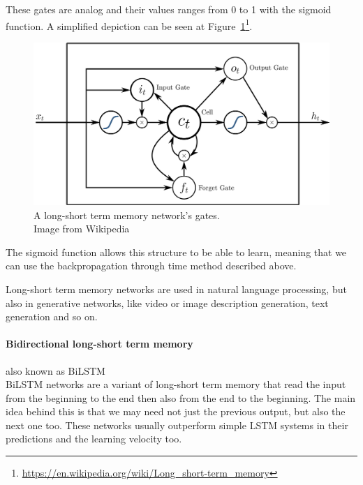 These gates are analog and their values ranges from 0 to 1 with the sigmoid function. A simplified depiction can be seen at Figure~\ref{fig:lstm}\footnote{\url{https://en.wikipedia.org/wiki/Long_short-term_memory}}.
\begin{figure}[!htb]
	\centering
	\includegraphics[scale=0.2]{figures/lstm.jpg}
	\caption{A long-short term memory network's gates.\\Image from Wikipedia}
	\label{fig:lstm}
\end{figure}
\FloatBarrier

The sigmoid function allows this structure to be able to learn, meaning that we can use the backpropagation through time method described above.

Long-short term memory networks are used in natural language processing, but also in generative networks, like video or image description generation, text generation and so on.

\paragraph*{Bidirectional long-short term memory} also known as BiLSTM\\
BiLSTM networks are a variant of long-short term memory that read the input from the beginning to the end then also from the end to the beginning. The main idea behind this is that we may need not just the previous output, but also the next one too. These networks usually outperform simple LSTM systems in their predictions and the learning velocity too.

